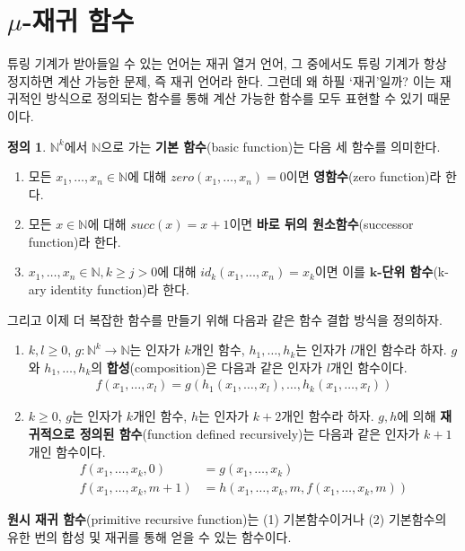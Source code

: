 \documentclass[b5paper, 11pt]{book}
\theoremstyle{definition}
\newtheorem{defn}{정의}[chapter]
\begin{document}
\section{$\mu$-재귀 함수} \label{mu-recursive}
튜링 기계가 받아들일 수 있는 언어는 재귀 열거 언어, 그 중에서도 튜링 기계가 항상 정지하면 계산 가능한 문제, 즉 재귀 언어라 한다. 그런데 왜 하필 `재귀'일까? 이는 재귀적인 방식으로 정의되는 함수를 통해 계산 가능한 함수를 모두 표현할 수 있기 때문이다.  
\begin{defn} \label{primitive recursive definition}
    $\mathbb{N}^k$에서 $\mathbb{N}$으로 가는 \textbf{기본 함수}(basic function)는 다음 세 함수를 의미한다.
    \begin{enumerate}
        \item 모든 $x_1, \ldots, x_n \in \mathbb{N}$에 대해 $zero(x_1, \ldots, x_n) = 0$이면 \textbf{영함수}(zero function)라 한다.
        \item 모든 $x \in \mathbb{N}$에 대해 $succ(x) = x+1$이면 \textbf{바로 뒤의 원소함수}(successor function)라 한다. 
        \item $x_1, \ldots, x_n \in \mathbb{N}, k \ge j > 0$에 대해 $id_k(x_1, \ldots, x_n) = x_k$이면 이를 $\mathbf{k}$\textbf{-단위 함수}(k-ary identity function)라 한다. 
    \end{enumerate}
    그리고 이제 더 복잡한 함수를 만들기 위해 다음과 같은 함수 결합 방식을 정의하자.
    \begin{enumerate}
        \item $k, l \ge 0$, $g: \mathbb{N}^k \rightarrow \mathbb{N}$는 인자가 $k$개인 함수, $h_1, \ldots, h_k$는 인자가 $l$개인 함수라 하자. $g$와 $h_1, \ldots, h_k$의 \textbf{합성}(composition)은 다음과 같은 인자가 $l$개인 함수이다.
        \begin{align*}
            f(x_1, \ldots , x_l) = g(h_1(x_1, \ldots , x_l), \ldots, h_k(x_1, \ldots, x_l))
        \end{align*}
        \item $k \ge 0$, $g$는 인자가 $k$개인 함수, $h$는 인자가 $k+2$개인 함수라 하자. $g, h$에 의해 
        \textbf{재귀적으로 정의된 함수}(function defined recursively)는 다음과 같은 인자가 $k+1$개인 함수이다.
        \begin{align*}
            f(x_1, \ldots, x_k, 0) &= g(x_1, \ldots, x_k) \\ 
            f(x_1, \ldots, x_k, m+1) &= h(x_1, \ldots, x_k, m, f(x_1, \ldots, x_k, m))
        \end{align*} 
    \end{enumerate}
    \textbf{원시 재귀 함수}(primitive recursive function)는 (1) 기본함수이거나 (2) 기본함수의 
    유한 번의 합성 및 재귀를 통해 얻을 수 있는 함수이다.
\end{defn}
\end{document}
